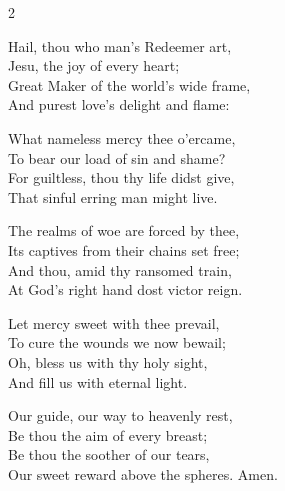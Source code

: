 \begin{multicols}{2}
\raggedcolumns
\begin{enpars}
Hail, thou who man's Redeemer art,\\
Jesu, the joy of every heart;\\
Great Maker of the world's wide frame,\\
And purest love's delight and flame:

What nameless mercy thee o'ercame,\\
To bear our load of sin and shame?\\
For guiltless, thou thy life didst give,\\
That sinful erring man might live.

The realms of woe are forced by thee,\\
Its captives from their chains set free;\\
And thou, amid thy ransomed train,\\
At God's right hand dost victor reign.

Let mercy sweet with thee prevail,\\
To cure the wounds we now bewail;\\
Oh, bless us with thy holy sight,\\
And fill us with eternal light.

Our guide, our way to heavenly rest,\\
Be thou the aim of every breast;\\
Be thou the soother of our tears,\\
Our sweet reward above the spheres. Amen.
\end{enpars}
\end{multicols}